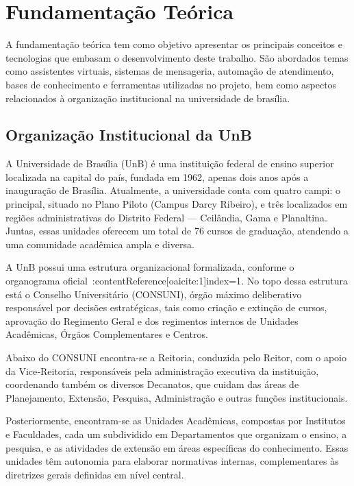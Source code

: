 \chapter[Fundamentação Teórica]{Fundamentação Teórica}

A fundamentação teórica tem como objetivo apresentar os principais conceitos e tecnologias que embasam o desenvolvimento deste trabalho. São abordados temas como assistentes virtuais, sistemas de mensageria, automação de atendimento, bases de conhecimento e ferramentas utilizadas no projeto, bem como aspectos relacionados à organização institucional na universidade de brasília.

\section{Organização Institucional da UnB}

A Universidade de Brasília (UnB) é uma instituição federal de ensino superior localizada na capital do país, fundada em 1962, apenas dois anos após a inauguração de Brasília. Atualmente, a universidade conta com quatro campi: o principal, situado no Plano Piloto (Campus Darcy Ribeiro), e três localizados em regiões administrativas do Distrito Federal — Ceilândia, Gama e Planaltina. Juntas, essas unidades oferecem um total de 76 cursos de graduação, atendendo a uma comunidade acadêmica ampla e diversa. 

A UnB possui uma estrutura organizacional formalizada, conforme o organograma oficial :contentReference[oaicite:1]{index=1}. No topo dessa estrutura está o Conselho Universitário (CONSUNI), órgão máximo deliberativo responsável por decisões estratégicas, tais como criação e extinção de cursos, aprovação do Regimento Geral e dos regimentos internos de Unidades Acadêmicas, Órgãos Complementares e Centros.

Abaixo do CONSUNI encontra-se a Reitoria, conduzida pelo Reitor, com o apoio da Vice‑Reitoria, responsáveis pela administração executiva da instituição, coordenando também os diversos Decanatos, que cuidam das áreas de Planejamento, Extensão, Pesquisa, Administração e outras funções institucionais.

Posteriormente, encontram-se as Unidades Acadêmicas, compostas por Institutos e Faculdades, cada um subdividido em Departamentos que organizam o ensino, a pesquisa, e as atividades de extensão em áreas específicas do conhecimento. Essas unidades têm autonomia para elaborar normativas internas, complementares às diretrizes gerais definidas em nível central.

